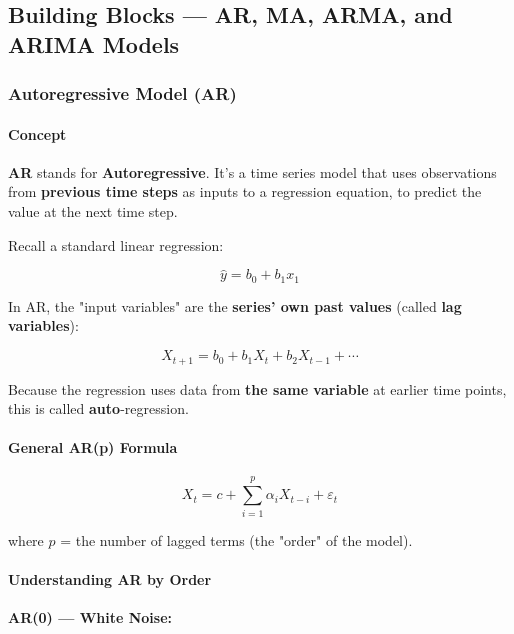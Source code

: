 \documentclass[12pt,openany]{book}
\begin{document}
\subsection{Building Blocks --- AR, MA, ARMA, and ARIMA Models}

\subsubsection{Autoregressive Model (AR)}

\paragraph{Concept}

\textbf{AR} stands for \textbf{Autoregressive}. It's a time series model that uses observations from \textbf{previous time steps} as inputs to a regression equation, to predict the value at the next time step.

Recall a standard linear regression:

\begin{equation*}
    \hat{y} = b_0 + b_1 x_1
\end{equation*}

In AR, the "input variables" are the \textbf{series' own past values} (called \textbf{lag variables}):

\begin{equation*}
    X_{t+1} = b_0 + b_1 X_t + b_2 X_{t-1} + \cdots
\end{equation*}

Because the regression uses data from \textbf{the same variable} at earlier time points, this is called \textbf{auto}-regression.

\paragraph{General AR(p) Formula}

\begin{equation*}
    X_t = c + \sum_{i=1}^{p} \alpha_i X_{t-i} + \varepsilon_t
\end{equation*}

where \(p\) = the number of lagged terms (the "order" of the model).

\paragraph{Understanding AR by Order}

\textbf{AR(0) --- White Noise:}
\end{document}
